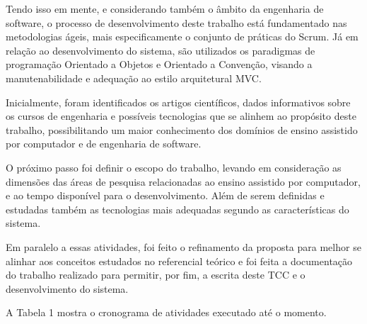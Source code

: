 Tendo isso em mente, e considerando também o âmbito da engenharia de software, o processo de desenvolvimento deste trabalho está fundamentado nas metodologias ágeis, mais especificamente o conjunto de práticas do Scrum. Já em relação ao desenvolvimento do sistema, são utilizados os paradigmas de programação Orientado a Objetos e Orientado a Convenção, visando a manutenabilidade e adequação ao estilo arquitetural MVC.

Inicialmente, foram identificados os artigos científicos, dados informativos sobre os cursos de engenharia e possíveis tecnologias que se alinhem ao propósito deste trabalho, possibilitando um maior conhecimento dos domínios de ensino assistido por computador e de engenharia de software.

O próximo passo foi definir o escopo do trabalho, levando em consideração as dimensões das áreas de pesquisa relacionadas ao ensino assistido por computador, e ao tempo disponível para o desenvolvimento. Além de serem definidas e estudadas também as tecnologias mais adequadas segundo as características do sistema.

Em paralelo a essas atividades, foi feito o refinamento da proposta para melhor se alinhar aos conceitos estudados no referencial teórico e foi feita a documentação do trabalho realizado para permitir, por fim, a escrita deste TCC e o desenvolvimento do sistema. 

A Tabela 1 mostra o cronograma de atividades executado até o momento.

